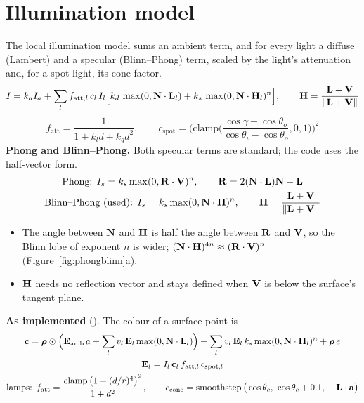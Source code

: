 \section{Illumination model}
\label{sec:illum}
The local illumination model sums an ambient term, and for every light a diffuse (Lambert) and a
specular (Blinn--Phong) term, scaled by the light's attenuation and, for a spot light, its cone factor.
\begin{equation}
I = k_a I_a + \sum_{l} f_{\text{att},l}\,c_l\,I_l\Big[k_d\,\max(0,\mathbf{N}\cdot\mathbf{L}_l) + k_s\,\max(0,\mathbf{N}\cdot\mathbf{H}_l)^{n}\Big],
\qquad \mathbf{H}=\frac{\mathbf{L}+\mathbf{V}}{\lVert\mathbf{L}+\mathbf{V}\rVert}
\label{eq:phong}
\end{equation}
\begin{equation}
f_{\text{att}}=\frac{1}{1+k_l d+k_q d^2},\qquad
c_{\text{spot}}=\Big(\mathrm{clamp}\Big(\frac{\cos\gamma-\cos\theta_o}{\cos\theta_i-\cos\theta_o},0,1\Big)\Big)^2
\label{eq:att}
\end{equation}
\textbf{Phong and Blinn--Phong.} Both specular terms are standard; the code uses the half-vector form.
\begin{gather}
\text{Phong: } I_s=k_s\max(0,\mathbf{R}\cdot\mathbf{V})^n,\qquad \mathbf{R}=2(\mathbf{N}\cdot\mathbf{L})\mathbf{N}-\mathbf{L}\label{eq:phongblinn}\\
\text{Blinn--Phong (used): } I_s=k_s\max(0,\mathbf{N}\cdot\mathbf{H})^n,\qquad \mathbf{H}=\frac{\mathbf{L}+\mathbf{V}}{\lVert\mathbf{L}+\mathbf{V}\rVert}\nonumber
\end{gather}
\begin{itemize}
\item The angle between $\mathbf{N}$ and $\mathbf{H}$ is half the angle between $\mathbf{R}$ and $\mathbf{V}$, so the Blinn lobe of exponent
$n$ is wider; $(\mathbf{N}\cdot\mathbf{H})^{4n}\approx(\mathbf{R}\cdot\mathbf{V})^{n}$ (Figure~\ref{fig:phongblinn}a).
\item $\mathbf{H}$ needs no reflection vector and stays defined when $\mathbf{V}$ is below the surface's tangent plane.
\end{itemize}
\textbf{As implemented} (). The colour of a surface point is
\begin{gather}
\vect c=\boldsymbol\rho\odot\Big(\vect E_{\text{amb}}\,a+\sum_l v_l\,\vect E_l\max(0,\vect N\cdot\vect L_l)\Big)
+\sum_l v_l\,\vect E_l\,k_s\max(0,\vect N\cdot\vect H_l)^n+\boldsymbol\rho\,e\label{eq:illumcode}\\
\vect E_l=I_l\,\vect c_l\,f_{\text{att},l}\,c_{\text{spot},l}\nonumber\\
\text{lamps: } f_{\text{att}}=\frac{\operatorname{clamp}\big(1-(d/r)^4\big)^2}{1+d^2},\qquad
c_{\text{cone}}=\operatorname{smoothstep}\big(\cos\theta_c,\ \cos\theta_c+0.1,\ -\vect L\cdot\vect a\big)\label{eq:lampatt}
\end{gather}
